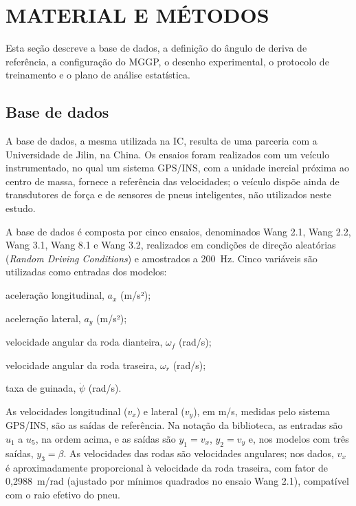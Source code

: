 \chapter{MATERIAL E MÉTODOS}\label{sec:metodos}

Esta seção descreve a base de dados, a definição do ângulo de deriva de referência, a configuração do MGGP, o desenho experimental, o protocolo de treinamento e o plano de análise estatística.

\section{Base de dados}\label{sec:base_dados}

A base de dados, a mesma utilizada na IC, resulta de uma parceria com a Universidade de Jilin, na China. Os ensaios foram realizados com um veículo instrumentado, no qual um sistema GPS/INS, com a unidade inercial próxima ao centro de massa, fornece a referência das velocidades; o veículo dispõe ainda de transdutores de força e de sensores de pneus inteligentes, não utilizados neste estudo.

A base de dados é composta por cinco ensaios, denominados Wang 2.1, Wang 2.2, Wang 3.1, Wang 8.1 e Wang 3.2, realizados em condições de direção aleatórias (\textit{Random Driving Conditions}) e amostrados a 200~Hz. Cinco variáveis são utilizadas como entradas dos modelos:

\begin{alineas}
    \item aceleração longitudinal, $a_x$ (m/s²);
    \item aceleração lateral, $a_y$ (m/s²);
    \item velocidade angular da roda dianteira, $\omega_f$ (rad/s);
    \item velocidade angular da roda traseira, $\omega_r$ (rad/s);
    \item taxa de guinada, $\dot\psi$ (rad/s).
\end{alineas}

As velocidades longitudinal ($v_x$) e lateral ($v_y$), em m/s, medidas pelo sistema GPS/INS, são as saídas de referência. Na notação da biblioteca, as entradas são $u_1$ a $u_5$, na ordem acima, e as saídas são $y_1 = v_x$, $y_2 = v_y$ e, nos modelos com três saídas, $y_3 = \beta$. As velocidades das rodas são velocidades angulares; nos dados, $v_x$ é aproximadamente proporcional à velocidade da roda traseira, com fator de 0,2988~m/rad (ajustado por mínimos quadrados no ensaio Wang 2.1), compatível com o raio efetivo do pneu.

